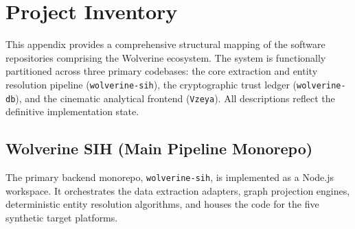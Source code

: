\chapter{Project Inventory}
\label{app:project_inventory}

This appendix provides a comprehensive structural mapping of the software repositories comprising the Wolverine ecosystem. The system is functionally partitioned across three primary codebases: the core extraction and entity resolution pipeline (\texttt{wolverine-sih}), the cryptographic trust ledger (\texttt{wolverine-db}), and the cinematic analytical frontend (\texttt{Vzeya}). All descriptions reflect the definitive implementation state.

\section{Wolverine SIH (Main Pipeline Monorepo)}
\label{app:project_inventory:wolverine_sih}

The primary backend monorepo, \texttt{wolverine-sih}, is implemented as a Node.js workspace. It orchestrates the data extraction adapters, graph projection engines, deterministic entity resolution algorithms, and houses the code for the five synthetic target platforms.

